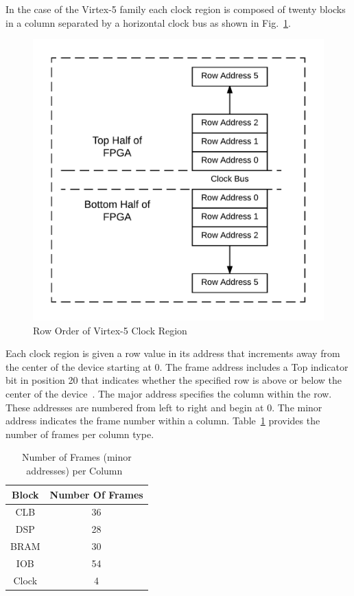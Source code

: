 \documentclass[conference]{IEEEtran}
\begin{document}
In the case of the Virtex-5 family each clock region is composed of twenty blocks in a column separated by a horizontal clock bus as shown in Fig.~\ref{fig:RowOrder}.
\begin{figure}[]
	\centering
	\includegraphics[width=1\linewidth]{Figures/RowOrder}
	\caption[Row Order of Virtex-5 Clock Region]{Row Order of Virtex-5 Clock Region}
	\label{fig:RowOrder}
\end{figure}
Each clock region is given a row value in its address that increments away from the center of the device starting at 0. 
The frame address includes a Top indicator bit in position 20 that indicates whether the specified row is above or below the center of the device~\cite{virtex5ConfigGuide}.
The major address specifies the column within the row.
These addresses are numbered from left to right and begin at 0.
The minor address indicates the frame number within a column. 
Table~\ref{tbl:minorAddressNumbers} provides the number of frames per column type.
\begin{table}[h]
	\centering
	\caption{Number of Frames (minor addresses) per Column~\cite{virtex5ConfigGuide}}
	\label{tbl:minorAddressNumbers}
	\begin{tabular}{|c|c|}
		\hline
		Block             & Number Of Frames \\ \hline
		CLB               & 36               \\ \hline
		DSP               & 28               \\ \hline
		\acrshort{BRAM}   & 30               \\ \hline
		IOB               & 54               \\ \hline
		Clock             & 4                \\ \hline
	\end{tabular}
\end{table}
\end{document}
